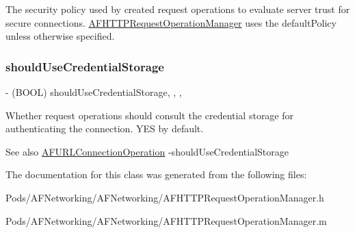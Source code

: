 The security policy used by created request operations to evaluate server trust for secure connections. {\ttfamily \mbox{\hyperlink{interface_a_f_h_t_t_p_request_operation_manager}{A\+F\+H\+T\+T\+P\+Request\+Operation\+Manager}}} uses the {\ttfamily default\+Policy} unless otherwise specified. \mbox{\label{interface_a_f_h_t_t_p_request_operation_manager_a9a9619e8520c1842a7aedec71002b81c}} 
\subsubsection{\texorpdfstring{should\+Use\+Credential\+Storage}{shouldUseCredentialStorage}}
{\footnotesize\ttfamily -\/ (B\+O\+OL) should\+Use\+Credential\+Storage\hspace{0.3cm}{\ttfamily [read]}, {\ttfamily [write]}, {\ttfamily [nonatomic]}, {\ttfamily [assign]}}

Whether request operations should consult the credential storage for authenticating the connection. {\ttfamily Y\+ES} by default.

\begin{DoxySeeAlso}{See also}
\mbox{\hyperlink{interface_a_f_u_r_l_connection_operation}{A\+F\+U\+R\+L\+Connection\+Operation}} -\/should\+Use\+Credential\+Storage 
\end{DoxySeeAlso}


The documentation for this class was generated from the following files\+:\begin{DoxyCompactItemize}
\item 
Pods/\+A\+F\+Networking/\+A\+F\+Networking/A\+F\+H\+T\+T\+P\+Request\+Operation\+Manager.\+h\item 
Pods/\+A\+F\+Networking/\+A\+F\+Networking/A\+F\+H\+T\+T\+P\+Request\+Operation\+Manager.\+m\end{DoxyCompactItemize}
